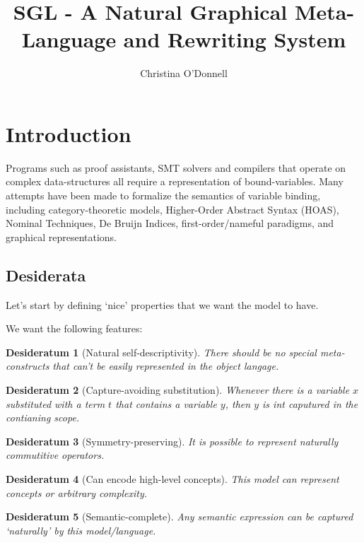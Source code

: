 \documentclass[a4paper,UKenglish,cleveref,autoref,thm-restate]{lipics-v2021}
\title{SGL - A Natural Graphical Meta-Language and Rewriting System}
\author{Christina O'Donnell}{Univerisity of Nottingham}{cdo@mutix.org}{}{}
\newtheorem{desideratum}{Desideratum}[theorem]
\begin{document}
\maketitle

\section{Introduction}
Programs such as proof assistants, SMT solvers and compilers that operate on
complex data-structures all require a representation of bound-variables. Many
attempts have been made to formalize the semantics of variable binding,
including category-theoretic models, Higher-Order Abstract Syntax (HOAS),
Nominal Techniques, De Bruijn Indices, first-order/nameful paradigms, and
graphical representations.

\subsection{Desiderata}
Let's start by defining `nice' properties that we want the model to have.

We want the following features:

\begin{desideratum}[Natural self-descriptivity]
\label{self-descriptivity}
There should be no special meta-constructs that can't be easily represented in the
object langage.
\end{desideratum}

\begin{desideratum}[Capture-avoiding substitution]
\label{capture-avoiding}
Whenever there is a variable $x$ substituted with a term $t$ that contains a variable $y$, then $y$ is int caputured in the contianing scope.
\end{desideratum}

\begin{desideratum}[Symmetry-preserving]
\label{symmetry-preserving}
It is possible to represent naturally commutitive operators.
\end{desideratum}

\begin{desideratum}[Can encode high-level concepts]
\label{high-level}
This model can represent concepts or arbitrary complexity. 
\end{desideratum}

\begin{desideratum}[Semantic-complete]
\label{semantic-completeness}
Any semantic expression can be captured `naturally' by this model/language.
\end{desideratum}
\end{document}
